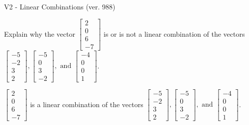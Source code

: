 \begin{exercise}
  \begin{exerciseTitle}V2 - Linear Combinations (ver. 988)\end{exerciseTitle}
  \begin{exerciseStatement}
    Explain why the vector \(\left[\begin{array}{c}
2 \\
0 \\
6 \\
-7
\end{array}\right]\)  is or is not a linear 
	combination of the vectors \(\left[\begin{array}{c}
-5 \\
-2 \\
3 \\
2
\end{array}\right] , \left[\begin{array}{c}
-5 \\
0 \\
3 \\
-2
\end{array}\right] , \text{ and } \left[\begin{array}{c}
-4 \\
0 \\
0 \\
1
\end{array}\right]\).
	


  \end{exerciseStatement}
  \begin{exerciseAnswer}
   \(\left[\begin{array}{c}
2 \\
0 \\
6 \\
-7
\end{array}\right]\) 
  	 is  
	a linear combination of the vectors \(\left[\begin{array}{c}
-5 \\
-2 \\
3 \\
2
\end{array}\right] , \left[\begin{array}{c}
-5 \\
0 \\
3 \\
-2
\end{array}\right] , \text{ and } \left[\begin{array}{c}
-4 \\
0 \\
0 \\
1
\end{array}\right]\).

	
  


  \end{exerciseAnswer}
\end{exercise}